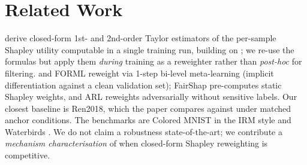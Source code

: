 \section{Related Work}
\label{sec:related}

\citet{wang2024inrun} derive closed-form 1st- and 2nd-order Taylor
estimators of the per-sample Shapley utility computable in a single
training run, building on \citet{ghorbani2019datashapley}; we re-use
the formulas but apply them \emph{during} training as a reweighter
rather than \emph{post-hoc} for filtering.
\citet{ren2018reweight} and FORML \citep{yan2022forml} reweight via
1-step bi-level meta-learning (implicit differentiation against a
clean validation set); FairShap \citep{arnaiz2023fairshap} pre-computes
static Shapley weights, and ARL \citep{lahoti2020arl} reweights
adversarially without sensitive labels. Our closest baseline is
Ren2018, which the paper compares against under matched anchor
conditions. The benchmarks are Colored MNIST in the IRM style
\citep{arjovsky2019irm} and Waterbirds \citep{sagawa2020groupdro}.
We do not claim a robustness state-of-the-art; we contribute a
\emph{mechanism characterisation} of when closed-form Shapley
reweighting is competitive.
